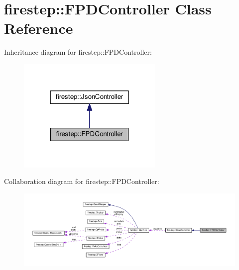 \hypertarget{classfirestep_1_1_f_p_d_controller}{\section{firestep\+:\+:F\+P\+D\+Controller Class Reference}
\label{classfirestep_1_1_f_p_d_controller}
}


Inheritance diagram for firestep\+:\+:F\+P\+D\+Controller\+:
\nopagebreak
\begin{figure}[H]
\begin{center}
\leavevmode
\includegraphics[width=198pt]{classfirestep_1_1_f_p_d_controller__inherit__graph}
\end{center}
\end{figure}


Collaboration diagram for firestep\+:\+:F\+P\+D\+Controller\+:
\nopagebreak
\begin{figure}[H]
\begin{center}
\leavevmode
\includegraphics[width=350pt]{classfirestep_1_1_f_p_d_controller__coll__graph}
\end{center}
\end{figure}
